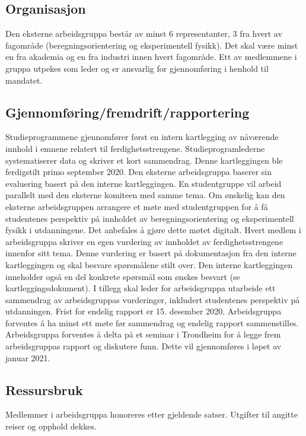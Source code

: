 \documentclass{article}
\begin{document}
\subsection{Organisasjon}
Den eksterne arbeidsgruppa består av minst 6 representanter, 3 fra hvert av fagområde (beregningsorientering og eksperimentell fysikk). Det skal være minst en fra akademia og en fra industri innen hvert fagområde.
Ett av medlemmene i gruppa utpekes som leder og er ansvarlig for gjennomføring i henhold til mandatet.

\subsection{Gjennomføring/fremdrift/rapportering}
Studieprogrammene gjennomfører først en intern kartlegging av nåværende innhold i emnene relatert til ferdighetsstrengene. Studieprogramlederne systematiserer data og skriver et kort sammendrag. Denne kartleggingen ble ferdigstilt primo september 2020.
Den eksterne arbeidsgruppa baserer sin evaluering basert på den interne kartleggingen. En studentgruppe vil arbeid parallelt med den eksterne komiteen med samme tema. Om ønskelig kan den eksterne arbeidsgruppen arrangere et møte med studentgruppen for å få studentenes perspektiv på innholdet av beregningsorientering og eksperimentell fysikk i utdanningene. Det anbefales å gjøre dette møtet digitalt.
Hvert medlem i arbeidsgruppa skriver en egen vurdering av innholdet av ferdighetsstrengene innenfor sitt tema. Denne vurdering er basert på dokumentasjon fra den interne kartleggingen og skal besvare spørsmålene stilt over. Den interne kartleggingen inneholder også en del konkrete spørsmål som ønskes besvart (se kartleggingsdokument).
I tillegg skal leder for arbeidsgruppa utarbeide ett sammendrag av arbeidsgruppas vurderinger, inkludert studentenes perspektiv på utdanningen. 
Frist for endelig rapport er 15. desember 2020.
Arbeidsgruppa forventes å ha minst ett møte før sammendrag og endelig rapport sammenstilles.
Arbeidsgruppa forventes å delta på et seminar i Trondheim for å legge frem arbeidsgruppas rapport og diskutere funn. Dette vil gjennomføres i løpet av januar 2021.

\subsection{Ressursbruk}
Medlemmer i arbeidsgruppa honoreres etter gjeldende satser.
Utgifter til angitte reiser og opphold dekkes.



\end{document}
